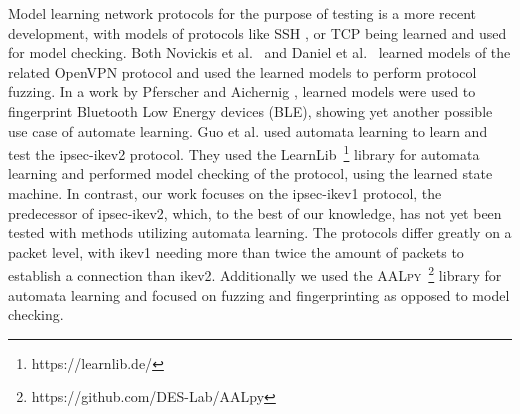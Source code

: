 Model learning network protocols for the purpose of testing is a more recent development, with models of protocols like SSH \parencite{fiteruau2017model}, or TCP \parencite{fiteruau2016combining} being learned and used for model checking. Both Novickis et al.~\parencite{novickis2016protocol} and Daniel et al.~\parencite{daniel2018inferring} learned models of the related OpenVPN protocol and used the learned models to perform protocol fuzzing. In a work by Pferscher and Aichernig \parencite{pferscher2021fingerprinting}, learned models were used to fingerprint Bluetooth Low Energy devices (BLE), showing yet another possible use case of automate learning. Guo et al. \parencite{guo2019model} used automata learning to learn and test the \ac{ipsec}-\ac{ike}v2 protocol. They used the LearnLib~\footnote{https://learnlib.de/} library for automata learning and performed model checking of the protocol, using the learned state machine. In contrast, our work focuses on the \ac{ipsec}-\ac{ike}v1 protocol, the predecessor of \ac{ipsec}-\ac{ike}v2, which, to the best of our knowledge, has not yet been tested with methods utilizing automata learning. The protocols differ greatly on a packet level, with \ac{ike}v1 needing more than twice the amount of packets to establish a connection than \ac{ike}v2.
Additionally we used the \textsc{AALpy}~\footnote{https://github.com/DES-Lab/AALpy} library for automata learning and focused on fuzzing and fingerprinting as opposed to model checking.
